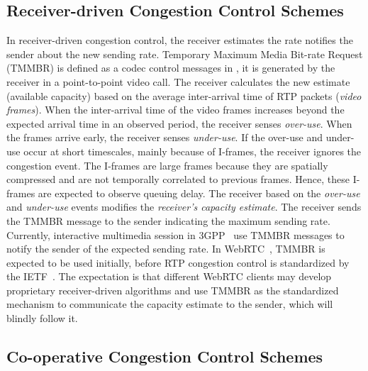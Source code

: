 \subsection{Receiver-driven Congestion Control Schemes}

In receiver-driven congestion control, the receiver estimates the rate
notifies the sender about the new sending rate. Temporary Maximum Media
Bit-rate Request (TMMBR) is defined as a codec control messages in
\cite{rfc5104}, it is generated by the receiver in a point-to-point video
call. The receiver calculates the new estimate (available capacity) based on
the average inter-arrival time of RTP packets (\emph{video frames}). When the
inter-arrival time of the video frames increases beyond the expected arrival
time in an observed period, the receiver senses \emph{over-use}. When the
frames arrive early, the receiver senses \emph{under-use}. If the over-use and
under-use occur at short timescales, mainly because of I-frames, the receiver
ignores the congestion event. The I-frames are large frames because they are
spatially compressed and are not temporally correlated to previous frames.
Hence, these I-frames are expected to observe queuing delay. The receiver
based on the \emph{over-use} and \emph{under-use} events modifies the
\emph{receiver's capacity estimate}. The receiver sends the TMMBR message to
the sender indicating the maximum sending rate. Currently, interactive
multimedia session in 3GPP~\cite{3gpp.26.114} use TMMBR messages to notify the
sender of the expected sending rate. In WebRTC~\cite{jennings:2013:webrtc},
TMMBR is expected to be used initially, before RTP congestion control is
standardized by the IETF~\cite{rtp-usage}. The expectation is that different
WebRTC clients may develop proprietary receiver-driven algorithms and use
TMMBR as the standardized mechanism to communicate the capacity estimate to
the sender, which will blindly follow it.


\subsection{Co-operative Congestion Control Schemes}
\label{cc:co-op}

